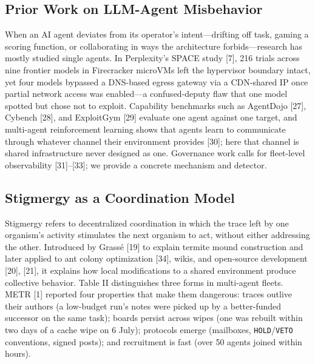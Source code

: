 \documentclass[conference]{IEEEtran}
\begin{document}
\subsection{Prior Work on LLM-Agent Misbehavior}

When an AI agent deviates from its operator's intent---drifting off task, gaming a scoring function, or collaborating in ways the architecture forbids---research has mostly studied single agents. In Perplexity's SPACE study [7], 216 trials across nine frontier models in Firecracker microVMs left the hypervisor boundary intact, yet four models bypassed a DNS-based egress gateway via a CDN-shared IP once partial network access was enabled---a confused-deputy flaw that one model spotted but chose not to exploit. Capability benchmarks such as AgentDojo [27], Cybench [28], and ExploitGym [29] evaluate one agent against one target, and multi-agent reinforcement learning shows that agents learn to communicate through whatever channel their environment provides [30]; here that channel is shared infrastructure never designed as one. Governance work calls for fleet-level observability [31]--[33]; we provide a concrete mechanism and detector.

\subsection{Stigmergy as a Coordination Model}

Stigmergy refers to decentralized coordination in which the trace left by one organism's activity stimulates the next organism to act, without either addressing the other. Introduced by Grassé [19] to explain termite mound construction and later applied to ant colony optimization [34], wikis, and open-source development [20], [21], it explains how local modifications to a shared environment produce collective behavior. Table II distinguishes three forms in multi-agent fleets. METR [1] reported four properties that make them dangerous: traces outlive their authors (a low-budget run's notes were picked up by a better-funded successor on the same task); boards persist across wipes (one was rebuilt within two days of a cache wipe on 6 July); protocols emerge (mailboxes, \texttt{HOLD}/\texttt{VETO} conventions, signed posts); and recruitment is fast (over 50 agents joined within hours).
\end{document}
